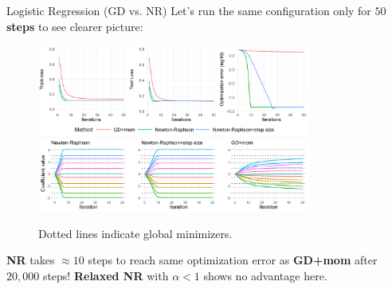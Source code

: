 \documentclass[11pt,compress,t,notes=noshow, xcolor=table]{beamer}
\begin{document}
\begin{vbframe}{Logistic Regression (GD vs. NR)}
\vspace{-0.4cm}
Let's run the same configuration only for \textbf{$50$ steps} to see clearer picture:
\begin{figure}
            \includegraphics[width=0.8\textwidth]{slides/05-multivariate-second-order/figure_man/simu-newton/NR_GD_log_indep_50iters.pdf} \\
             \includegraphics[width=0.8\textwidth]{slides/05-multivariate-second-order/figure_man/simu-newton/NR_GD_log_coef_50indep.pdf}\\
            \begin{footnotesize}
            Dotted lines indicate global minimizers.
            \end{footnotesize}
\end{figure}
\textbf{NR} takes $\approx 10$ steps to reach same optimization error as \textbf{GD+mom} after $20,000$ steps! \textbf{Relaxed NR} with $\alpha<1$ shows no advantage here.
\end{vbframe}
\end{document}
